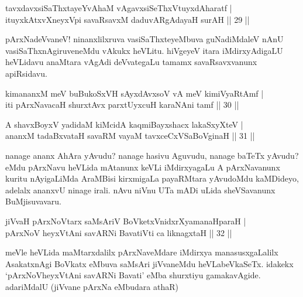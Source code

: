 \begin{shl}
tavxdavxsiSaThxtayeYvAhaM vAgavxsiSeThxVtuyxdAharatf | \\
ituyxkAtxvX\s neyxV\s pi savaRsavxM daduvARgAdayaH surAH \hfill|| 29 || 
\end{shl}

\begin{artha}
pArxNadeVvaneV! ninanxlilxruva vasiSaThxteyeMbuva guNadiMdaleV nAnU 
vasiSaThxnAgiruveneMdu vAkukx heVLitu. hiVgeyeV itara iMdirxyAdigaLU 
heVLidavu anaMtara vAgAdi deVvategaLu tamamx savaRsavxvanunx apiRsidavu.
\end{artha}


\begin{shl}
kimananxM meV buBukoSxVH sAyxdAvxsoV vA meV kimiVyaRtAmf | \\
iti pArxNavacaH shurxtAvx parxtUyxcuH karaNAni tamf \hfill|| 30 || 
\end{shl}

\begin{shl}
A shavxBoyxV yadidaM kiMcidA kaqmiBayxshacx lakaSxyXteV | \\
ananxM tadaBxvataH savaRM vayaM tavxceCxVSaBoVginaH \hfill|| 31 || 
\end{shl}

\begin{artha}
nanage ananx AhAra yAvudu? nanage hasivu Aguvudu, nanage baTeTx 
yAvudu? eMdu pArxNavu heVLida mAtanunx keVLi iMdirxyagaLu A 
pArxNavanunx kuritu nAyigaLiMda AraMBisi kirxmigaLa payaRMtara 
yAvudoMdu kaMDideyo, adelalx ananxvU ninage irali. nAvu niVnu UTa mADi 
uLida sheVSavanunx BuMjisuvavaru.
\end{artha}


\begin{shl}
jiVvaH pArxNoV\s tarx saMsAriV BoVketxVnidxrXyamanaHparaH | \\
\footnotemark[1]pArxNoV heyxVtAni savARNi BavatiVti ca liknagxtaH \hfill|| 32 || 
\end{shl}

\begin{artha}
meVle heVLida maMtarxdalilx pArxNaveMdare iMdirxya manasusxgaLalilx AsakatxnAgi BoVkatx eMbuva saMsAri jiVvaneMdu heVLabeVkaSeTx. idakekx `pArxNoVheyxVtAni savARNi Bavati' eMba shurxtiyu gamakavAgide. adariMdalU (jiVvane pArxNa eMbudara athaR)
\end{artha}

